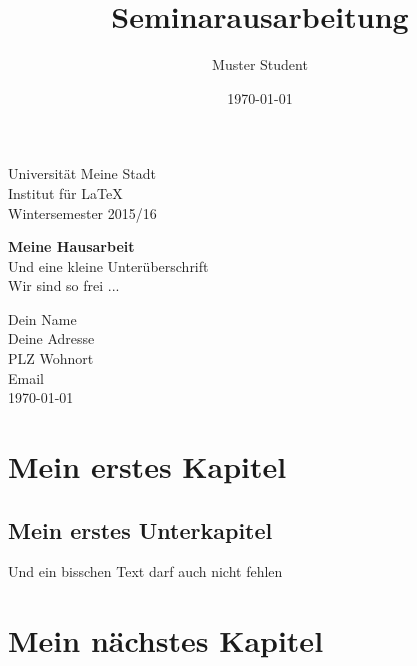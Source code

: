 \documentclass[12pt]{article}
\title{Seminarausarbeitung}
\author {Muster Student}
\date{ \today}
\begin{document}
\begin{titlepage} 
	\begin{small}
    \vfill {
Universität Meine Stadt\\ 
Institut für \LaTeX \\ 
Wintersemester 2015/16}
  \end{small}
  \begin{center}
    \begin{Large}
      \vfill {\textsf{\textbf{Meine Hausarbeit} } \\ {\small{Und eine kleine Unterüberschrift}} \\ {\tiny Wir sind so frei ...} }
    \end{Large}
  \end{center}
    \begin{small}
    \vfill Dein Name \\ Deine Adresse \\  PLZ Wohnort \\  Email\\ 
    \today
  \end{small}
\end{titlepage}

\newpage

\tableofcontents

\newpage

\section{Mein erstes Kapitel}

\subsection{Mein erstes Unterkapitel}

Und ein bisschen Text darf auch nicht fehlen \cite{macklin2013position}

\section{Mein nächstes Kapitel}


\newpage


\end{document}
